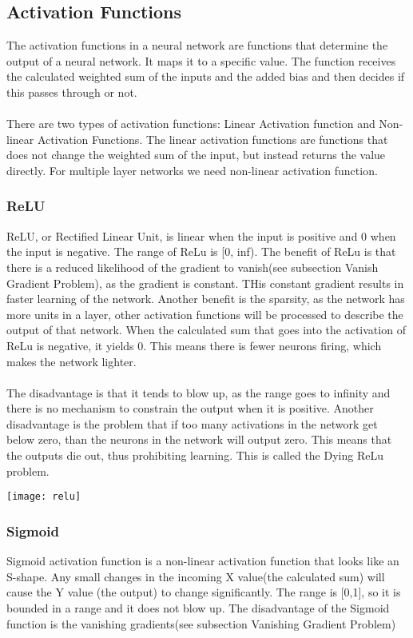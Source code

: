 \subsection{Activation Functions}
The activation functions in a neural network are functions that determine the output of a neural network. It maps it to a specific value. The function receives the calculated weighted sum of the inputs and the added bias and then decides if this passes through or not. \\\\
There are two types of activation functions: Linear Activation function and Non-linear Activation Functions.
The linear activation functions are functions that does not change the weighted sum of the input, but instead returns the value directly. For multiple layer networks we need non-linear activation function.

\subsubsection{ReLU}
ReLU, or Rectified Linear Unit, is linear when the input is positive and 0 when the input is negative. The range of ReLu is [0, inf). The benefit of ReLu is that there is a reduced likelihood of the gradient to vanish(see subsection Vanish Gradient Problem), as the gradient is constant. THis constant gradient results in faster learning of the network. Another benefit is the sparsity, as the network has more units in a layer, other activation functions will be processed to describe the output of that network. When the calculated sum that goes into the activation of ReLu is negative, it yields 0. This means there is fewer neurons firing, which makes the network lighter.\\\\
The disadvantage is that it tends to blow up, as the range goes to infinity and there is no mechanism to constrain the output when it is positive. Another disadvantage is the problem that if too many activations in the network get below zero, than the neurons in the network will output zero. This means that the outputs die out, thus prohibiting learning. This is called the Dying ReLu problem.

\texttt{[image: relu]}


\subsubsection{Sigmoid}
Sigmoid activation function is a non-linear activation function that looks like an S-shape. Any small changes in the incoming X value(the calculated sum) will cause the Y value (the output) to change significantly. The range is [0,1], so it is bounded in a range and it does not blow up. The disadvantage of the Sigmoid function is the vanishing gradients(see subsection Vanishing Gradient Problem)

